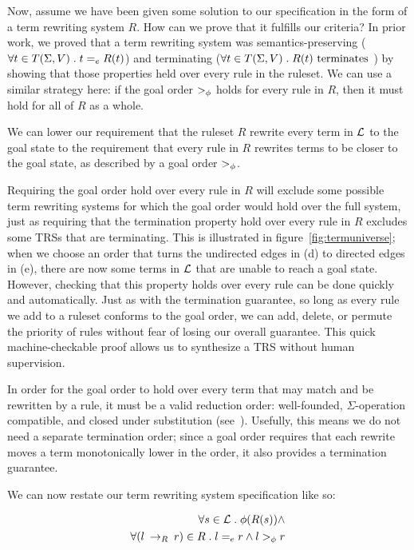Now, assume we have been given some solution to our specification in the form of a term rewriting system $R$. How can we prove that it fulfills our criteria? In prior work, we proved that a term rewriting system was semantics-preserving ($\forall t \in T(\Sigma,V) \;.\; t =_e R(t)$) and terminating ($\forall t \in T(\Sigma,V) \;.\; R(t) \textrm{ terminates }$) by showing that those properties held over every rule in the ruleset. We can use a similar strategy here: if the goal order $>_{\phi}$ holds for every rule in $R$, then it must hold for all of $R$ as a whole.

\begin{assumption}
We can lower our requirement that the ruleset $R$ rewrite every term in $\mathcal{L}$ to the goal state to the requirement that every rule in $R$ rewrites terms to be closer to the goal state, as described by a goal order $>_{\phi}$.
\end{assumption}

Requiring the goal order hold over every rule in $R$ will exclude some possible term rewriting systems for which the goal order would hold over the full system, just as requiring that the termination property hold over every rule in $R$ excludes some TRSs that are terminating. This is illustrated in figure~\ref{fig:termuniverse}; when we choose an order that turns the undirected edges in (d) to directed edges in (e), there are now some terms in $\mathcal{L}$ that are unable to reach a goal state. However, checking that this property holds over every rule can be done quickly and automatically. Just as with the termination guarantee, so long as every rule we add to a ruleset conforms to the goal order, we can add, delete, or permute the priority of rules without fear of losing our overall guarantee. This quick machine-checkable proof allows us to synthesize a TRS without human supervision.

In order for the goal order to hold over every term that may match and be rewritten by a rule, it must be a valid reduction order: well-founded, $\Sigma$-operation compatible, and closed under substitution (see~\cite{baader1999term}). Usefully, this means we do not need a separate termination order; since a goal order requires that each rewrite moves a term monotonically lower in the order, it also provides a termination guarantee.

We can now restate our term rewriting system specification like so:

\begin{align*}
    \forall s \in \mathcal{L} \;.\; \phi(R(s)) \wedge \\
    \forall (l \:\rightarrow_{R}\: r) \in R \;.\; l =_e r \wedge l >_{\phi} r
\end{align*}

